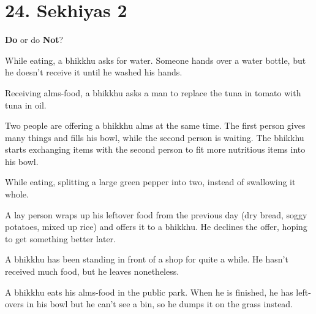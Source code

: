 \chapter{24. Sekhiyas 2}
\renewcommand*{\theChapterTitle}{24. Sekhiyas 2}

\begin{exam}{\autoExamName}

  \begin{problem*}
    \textbf{Do} or do \textbf{Not}?

    \bigskip

    \begin{parts}

    \item {} While eating, a bhikkhu asks for water. Someone hands over a
      water bottle, but he doesn't receive it until he washed his hands.

    \bigskip

    \item {} Receiving alms-food, a bhikkhu asks a man to replace the tuna
      in tomato with tuna in oil.

    \bigskip

    \item {} Two people are offering a bhikkhu alms at the same time. The
      first person gives many things and fills his bowl, while the second person
      is waiting. The bhikkhu starts exchanging items with the second person to
      fit more nutritious items into his bowl.

    \bigskip

    \item {} While eating, splitting a large green pepper into two, instead
    of swallowing it whole.

    \bigskip

    \item {} A lay person wraps up his leftover food from the previous day
      (dry bread, soggy potatoes, mixed up rice) and offers it to a bhikkhu. He
      declines the offer, hoping to get something better later.

    \bigskip

    \item {} A bhikkhu has been standing in front of a shop for quite a while.
    He hasn't received much food, but he leaves nonetheless.

    \bigskip

    \item {} A bhikkhu eats his alms-food in the public park. When he is
      finished, he has left-overs in his bowl but he can't see a bin, so he
      dumps it on the grass instead.


\end{parts}
\end{problem*}
\end{exam}
